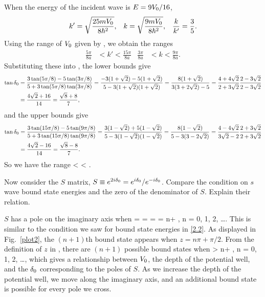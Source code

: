 \begin{solution}
	When the energy of the incident wave is $E = 9 V_0 / 16$,
	\begin{align*}
		k' &= \sqrt{\frac{25 m V_0}{8 \hbar^2}}, &
		k &= \sqrt{\frac{9 m V_0}{8 \hbar^2}}, &
		\frac{k}{k'} = \frac{3}{5}.
	\end{align*}
	Using the range of $V_0$ given by , we obtain the ranges
	\begin{align*}
		\frac{5 \pi}{8 a} &< k' < \frac{15 \pi}{8 a} &
		\frac{3 \pi}{8 a} &< k < \frac{9 \pi}{8 a}.
	\end{align*}
	Substituting these into , the lower bounds give
	\begin{align*}
		\tan\delta_0 &= \frac{3 \tan(5 \pi / 8) - 5 \tan(3\pi / 8)}{5 + 3 \tan(5 \pi / 8) \tan(3\pi / 8)}
		= \frac{-3 (1 + \sqrt{2}) - 5 (1 + \sqrt{2})}{5 - 3 (1 + \sqrt{2}) (1 + \sqrt{2})}
		= \frac{8 (1 + \sqrt{2})}{3(3 + 2 \sqrt{2}) - 5}
		= \frac{4 + 4 \sqrt{2}}{2 + 3 \sqrt{2}} \frac{2 - 3 \sqrt{2}}{2 - 3 \sqrt{2}} \\
		&= \frac{4 \sqrt{2} + 16}{14}
		= \frac{\sqrt{8} + 8}{7},
	\end{align*}
	and the upper bounds give
	\begin{align*}
		\tan\delta_0 &= \frac{3 \tan(15 \pi / 8) - 5 \tan(9\pi / 8)}{5 + 3 \tan(15 \pi / 8) \tan(9\pi / 8)}
		= \frac{3 (1 - \sqrt{2}) + 5 (1 - \sqrt{2})}{5 - 3 (1 - \sqrt{2}) (1 - \sqrt{2})}
		= \frac{8 (1 - \sqrt{2})}{5 - 3 (3 - 2 \sqrt{2})}
		= \frac{4 - 4 \sqrt{2}}{3 \sqrt{2} - 2} \frac{2 + 3 \sqrt{2}}{2 + 3 \sqrt{2}} \\
		&= \frac{4 \sqrt{2} - 16}{14}
		= \frac{\sqrt{8} - 8}{7}.
	\end{align*}
	So we have the range
	\beq
		 < \tan\delo < .
	\eeq
	\vfix
\end{solution}



\clearpage
\begin{problem}
	Now consider the $S$ matrix, $S \equiv e^{2i \delta_0} = e^{i \delta_0} / e^{-i \delta_0}$.  Compare the condition on $s$ wave bound state energies and the zero of the denominator of $S$.  Explain their relation.
\end{problem}

\begin{solution}
	$S$ has a pole on the imaginary axis when
	 = \Re[e^{-i \delo}] =  = \cos\delo
		\qimplies
		\delo = n\pi + , \quad n = 0, 1, 2, \ldots.
	\eeq
	This is similar to the condition we saw for bound state energies in \ref{2.2}.  As displayed in Fig.~\ref{plot2}, the $(n + 1)$th bound state appears when $z = n\pi + \pi / 2$.  From the definition of $z$ in , there are $(n + 1)$ possible bound states when
	\beq
		 > n\pi + , \quad n = 0, 1, 2, \ldots,
	\eeq
	which gives a relationship between $V_0$, the depth of the potential well, and the $\delta_0$ corresponding to the poles of $S$.  As we increase the depth of the potential well, we move along the imaginary axis, and an additional bound state is possible for every pole we cross.
\end{solution}

